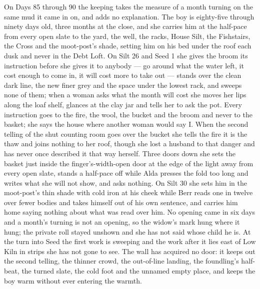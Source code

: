 \documentclass{design/chronicle}
\begin{document}
{On Days 85 through 90 the keeping takes the measure of a month turning on the same mud it came in on, and adds no explanation. The boy is eighty-five through ninety days old, three months at the close, and she carries him at the half-pace from every open slate to the yard, the well, the racks, House Silt, the Fishstairs, the Cross and the moot-post’s shade, setting him on his bed under the roof each dusk and never in the Debt Loft. On Silt 26 and Seed 1 she gives the broom its instruction before she gives it to anybody --- go around what the water left, it cost enough to come in, it will cost more to take out --- stands over the clean dark line, the new finer grey and the space under the lowest rack, and sweeps none of them; when a woman asks what the month will cost she moves her lips along the loaf shelf, glances at the clay jar and tells her to ask the pot. Every instruction goes to the fire, the wool, the bucket and the broom and never to the basket; she says the house where another woman would say I. When the second telling of the shut counting room goes over the bucket she tells the fire it is the thaw and joins nothing to her roof, though she lost a husband to that danger and has never once described it that way herself. Three doors down she sets the basket just inside the finger’s-width-open door at the edge of the light away from every open slate, stands a half-pace off while Alda presses the fold too long and writes what she will not show, and asks nothing. On Silt 30 she sets him in the moot-post’s thin shade with cold iron at his cheek while Berr reads one in twelve over fewer bodies and takes himself out of his own sentence, and carries him home saying nothing about what was read over him. No opening came in six days and a month’s turning is not an opening, so the widow’s mark hung where it hung; the private roll stayed unshown and she has not said whose child he is. At the turn into Seed the first work is sweeping and the work after it lies east of Low Kiln in strips she has not gone to see. The wall has acquired no door: it keeps out the second telling, the thinner crowd, the out-of-line landing, the foundling’s half-beat, the turned slate, the cold foot and the unnamed empty place, and keeps the boy warm without ever entering the warmth.

}
\end{document}
